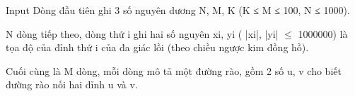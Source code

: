 Input
Dòng đầu tiên ghi 3 số nguyên dương N, M, K (K ≤ M ≤ 100, N ≤ 1000).   


   N dòng tiếp theo, dòng thứ i ghi hai số nguyên xi, yi ( |xi|, |yi|  $\le$  1000000) là tọa độ của đỉnh thứ i của đa giác lồi (theo chiều ngược kim đồng hồ).   


   Cuối cùng là M dòng, mỗi dòng mô tả một đường rào, gồm 2 số u, v cho biết đường rào nối hai đỉnh u và v.